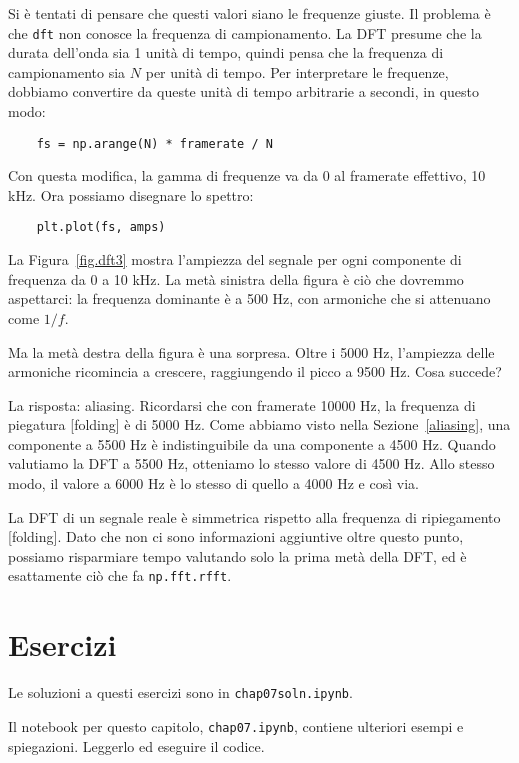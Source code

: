 \documentclass[12pt,a4paper]{book}
\begin{document}
Si è tentati di pensare che questi valori siano le frequenze giuste. Il problema è che {\tt dft} non conosce la frequenza di campionamento. La DFT presume che la durata dell'onda sia 1 unità di tempo, quindi pensa che la frequenza di campionamento sia $N$ per unità di tempo. Per interpretare le frequenze, dobbiamo convertire da queste unità di tempo arbitrarie a secondi, in questo modo:

\begin{verbatim} 
    fs = np.arange(N) * framerate / N
 \end{verbatim} 

Con questa modifica, la gamma di frequenze va da 0 al framerate effettivo, 10 kHz. Ora possiamo disegnare lo spettro:

\begin{verbatim} 
    plt.plot(fs, amps)
 \end{verbatim} 

La Figura~\ref{fig.dft3} mostra l'ampiezza del segnale per ogni componente di frequenza da 0 a 10 kHz. La metà sinistra della figura è ciò che dovremmo aspettarci: la frequenza dominante è a 500 Hz, con armoniche che si attenuano come $1/f$.

Ma la metà destra della figura è una sorpresa. Oltre i 5000 Hz, l'ampiezza delle armoniche ricomincia a crescere, raggiungendo il picco a 9500 Hz. Cosa succede?

La risposta: aliasing. Ricordarsi che con framerate 10000 Hz, la frequenza di piegatura [folding] è di 5000 Hz. Come abbiamo visto nella Sezione~\ref{aliasing}, una componente a 5500 Hz è indistinguibile da una componente a 4500 Hz. Quando valutiamo la DFT a 5500 Hz, otteniamo lo stesso valore di 4500 Hz. Allo stesso modo, il valore a 6000 Hz è lo stesso di quello a 4000 Hz e così via.

La DFT di un segnale reale è simmetrica rispetto alla frequenza di ripiegamento [folding]. Dato che non ci sono informazioni aggiuntive oltre questo punto, possiamo risparmiare tempo valutando solo la prima metà della DFT, ed è esattamente ciò che fa {\tt np.fft.rfft}.

\section{Esercizi} 

Le soluzioni a questi esercizi sono in {\tt chap07soln.ipynb}.

\begin{exercise} Il notebook per questo capitolo, {\tt chap07.ipynb}, contiene ulteriori esempi e spiegazioni. Leggerlo ed eseguire il codice. \end{exercise} 
\end{document}
